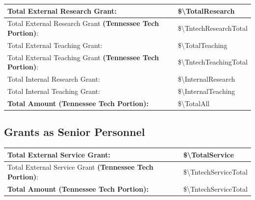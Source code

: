 





\begin{table}[!h]
    \centering
    \begin{tabular}{|l|l|}
    \hline
        Total External Research Grant: &  \$\num[group-separator={,}]{\TotalResearch} \\
    \hline        
        Total External Research Grant \textbf{(Tennessee Tech Portion)}: &  \$\num[group-separator={,}]{\TntechResearchTotal} \\
    \hline
    \hline
        Total External Teaching Grant: &  \$\num[group-separator={,}]{\TotalTeaching} \\
    \hline        
        Total External Teaching Grant \textbf{(Tennessee Tech Portion)}: &  \$\num[group-separator={,}]{\TntechTeachingTotal} \\
    \hline
    \hline
        Total Internal Research Grant: &  \$\num[group-separator={,}]{\InternalResearch}\\
    \hline        
        Total Internal Teaching Grant: &  \$\num[group-separator={,}]{\InternalTeaching}\\     
    \hline 
    \hline
        \textbf{Total Amount (Tennessee Tech Portion):} &  \$\num[group-separator={,}]{\TotalAll}\\
    \hline   
    \end{tabular}
    \label{tab:my_label}
\end{table}

\hspace{2em}
\subsection{Grants as Senior Personnel}

\begin{table}[!h]
    \centering
    \begin{tabular}{|l|l|}
    \hline
        
    \hline
        Total External Service Grant: &  \$\num[group-separator={,}]{\TotalService} \\
    \hline        
        Total External Service Grant \textbf{(Tennessee Tech Portion)}: &  \$\num[group-separator={,}]{\TntechServiceTotal} \\
    \hline
        \textbf{Total Amount (Tennessee Tech Portion):} &  \$\num[group-separator={,}]{\TntechServiceTotal}\\
    \hline   
    \end{tabular}
    \label{tab:my_label}
\end{table}
